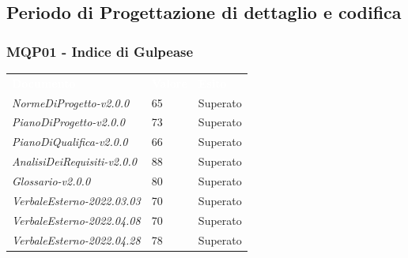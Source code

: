 \subsection{Periodo di Progettazione di dettaglio e codifica}
\subsubsection{MQP01 - Indice di Gulpease}
\begin{table}[H]
        \renewcommand{\arraystretch}{1.5}
        \begin{tabular}{m{}<{\centering}  m{}<{\centering}  m{}<{\centering} }
            \rowcolor{darkblue}
            \textcolor{white}{\textbf{Documento}}& \textcolor{white}{\textbf{Valore}} & \textcolor{white}{\textbf{Esito}}\\ 

            \textit{NormeDiProgetto-v2.0.0} &
            65 &
            Superato \\

            \textit{PianoDiProgetto-v2.0.0} &
            73 &
            Superato \\

            \textit{PianoDiQualifica-v2.0.0} &
            66 &
            Superato \\

            \textit{AnalisiDeiRequisiti-v2.0.0} &
            88 &
            Superato \\
            
            \textit{Glossario-v2.0.0} &
            80 &
            Superato \\

            \textit{VerbaleEsterno-2022.03.03} &
            70 &
            Superato \\
            
            \textit{VerbaleEsterno-2022.04.08} &
            70 &
            Superato \\

            \textit{VerbaleEsterno-2022.04.28} &
            78&
            Superato \\


\end{tabular}
\end{table}
